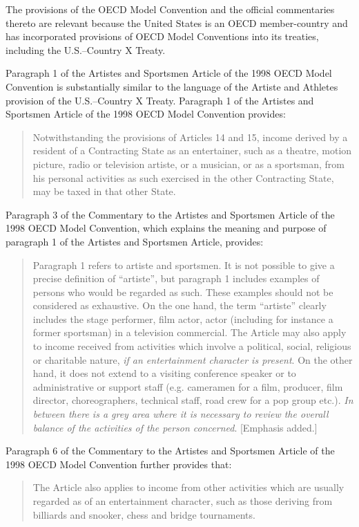 \begin{select}
The provisions of the OECD Model Convention and the official commentaries
thereto are relevant because the United States is an OECD member-country and
has incorporated provisions of OECD Model Conventions into its treaties, including
the U.S.--Country X Treaty. 

Paragraph 1 of the Artistes and Sportsmen Article of the 1998 OECD Model
Convention is substantially similar to the language of the Artiste and Athletes
provision of the U.S.--Country X Treaty. Paragraph 1 of the Artistes and Sportsmen
Article of the 1998 OECD Model Convention provides:
\begin{quotation}
Notwithstanding the provisions of Articles 14 and 15, income derived by a
resident of a Contracting State as an entertainer, such as a theatre, motion
picture, radio or television artiste, or a musician, or as a sportsman, from his
personal activities as such exercised in the other Contracting State, may be
taxed in that other State. 
\end{quotation}
Paragraph 3 of the Commentary to the Artistes and Sportsmen Article of the 1998
OECD Model Convention, which explains the meaning and purpose of paragraph 1
of the Artistes and Sportsmen Article, provides:
\begin{quotation}
Paragraph 1 refers to artiste and sportsmen. It is not possible to give a
precise definition of ``artiste'', but paragraph 1 includes examples of persons
who would be regarded as such. These examples should not be considered
as exhaustive. On the one hand, the term ``artiste'' clearly includes the stage
performer, film actor, actor (including for instance a former sportsman) in a
television commercial. The Article may also apply to income received from
activities which involve a political, social, religious or charitable nature, \emph{if an
entertainment character is present}. On the other hand, it does not extend to
a visiting conference speaker or to administrative or support staff (e.g.
cameramen for a film, producer, film director, choreographers, technical staff,
road crew for a pop group etc.). \emph{In between there is a grey area where it is
necessary to review the overall balance of the activities of the person
concerned}. [Emphasis added.]
\end{quotation}

Paragraph 6 of the Commentary to the Artistes and Sportsmen Article of the 1998
OECD Model Convention further provides that:
\begin{quotation}

The Article also applies to income from other activities which are usually
regarded as of an entertainment character, such as those deriving from
billiards and snooker, chess and bridge tournaments.
 \end{quotation}
 

\end{select}
